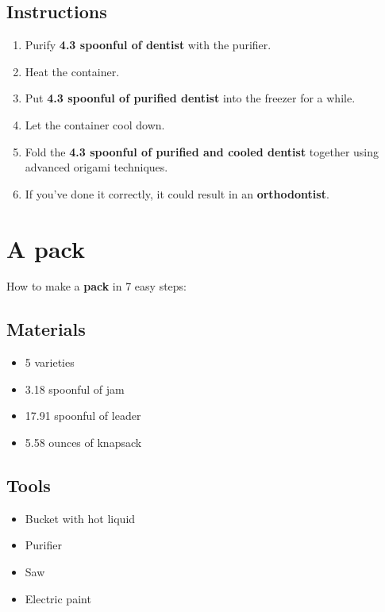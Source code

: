 \documentclass{article}
\begin{document}
\subsection{Instructions}\begin{enumerate}
\item 
Purify \textbf{4.3 spoonful of dentist} with the purifier.
\item 
Heat the container.
\item 
Put \textbf{4.3 spoonful of purified dentist} into the freezer for a while.
\item 
Let the container cool down.
\item 
Fold the \textbf{4.3 spoonful of purified and cooled dentist} together using advanced origami techniques.
\item 
If you've done it correctly, it could result in an \textbf{orthodontist}.
\end{enumerate}
\newpage
\section{A pack}How to make a \textbf{pack} in 7 easy steps:

\subsection{Materials}\begin{itemize}
\item 
5 varieties
\item 
3.18 spoonful of jam
\item 
17.91 spoonful of leader
\item 
5.58 ounces of knapsack
\end{itemize}
\subsection{Tools}\begin{itemize}
\item 
Bucket with hot liquid
\item 
Purifier
\item 
Saw
\item 
Electric paint
\end{itemize}
\end{document}
